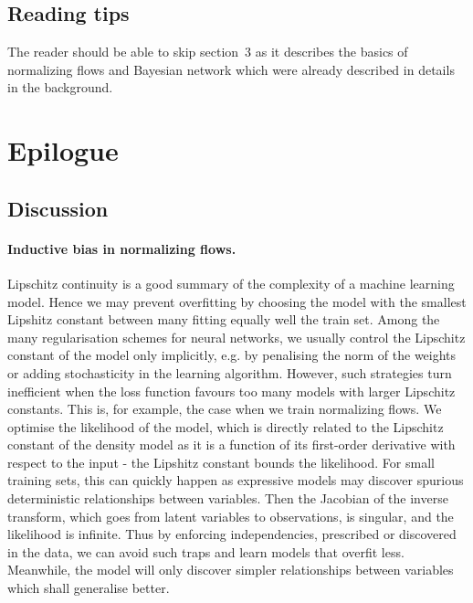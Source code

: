 \subsection{Reading tips}
The reader should be able to skip section~3 as it describes the basics of normalizing flows and Bayesian network which were already described in details in the background.



\section{Epilogue}
\subsection{Discussion}

\paragraph{Inductive bias in normalizing flows.}
Lipschitz continuity is a good summary of the complexity of a machine learning model. Hence we may prevent overfitting by choosing the model with the smallest Lipshitz constant between many fitting equally well the train set. Among the many regularisation schemes for neural networks, we usually control the Lipschitz constant of the model only implicitly, e.g. by penalising the norm of the weights or adding stochasticity in the learning algorithm. However, such strategies turn inefficient when the loss function favours too many models with larger Lipschitz constants. This is, for example, the case when we train normalizing flows. We optimise the likelihood of the model, which is directly related to the Lipschitz constant of the density model as it is a function of its first-order derivative with respect to the input - the Lipshitz constant bounds the likelihood. For small training sets, this can quickly happen as expressive models may discover spurious deterministic relationships between variables. Then the Jacobian of the inverse transform, which goes from latent variables to observations, is singular, and the likelihood is infinite. Thus by enforcing independencies, prescribed or discovered in the data, we can avoid such traps and learn models that overfit less. Meanwhile, the model will only discover simpler relationships between variables which shall generalise better.


